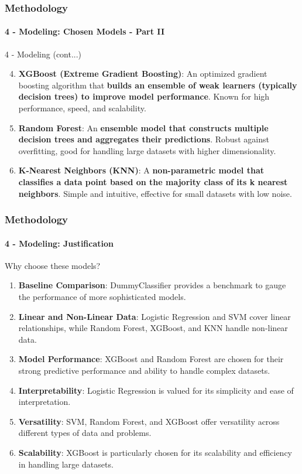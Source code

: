 \begin{frame}
	\frametitle{Methodology}
	\framesubtitle{4 - Modeling: Chosen Models - Part II}	
	\begin{block}{4 - Modeling (cont...)} 
		\begin{enumerate}
			\setcounter{enumi}{3}
			\item \textbf{XGBoost (Extreme Gradient Boosting)}: An optimized gradient boosting algorithm that \textbf{builds an ensemble of weak learners (typically decision trees) to improve model performance}. Known for high performance, speed, and scalability.
			
			\item \textbf{Random Forest}: An \textbf{ensemble model that constructs multiple decision trees and aggregates their predictions}. Robust against overfitting, good for handling large datasets with higher dimensionality.
			
			\item \textbf{K-Nearest Neighbors (KNN)}: A \textbf{non-parametric model that classifies a data point based on the majority class of its k nearest neighbors}. Simple and intuitive, effective for small datasets with low noise.
		\end{enumerate}
	\end{block}
\end{frame}




\begin{frame}
	\frametitle{Methodology}
	\framesubtitle{4 - Modeling: Justification}	
	\begin{alertblock}{Why choose these models?} 
		\begin{enumerate}
			\scriptsize
			\item \textbf{Baseline Comparison}: DummyClassifier provides a benchmark to gauge the performance of more sophisticated models.

			\item \textbf{Linear and Non-Linear Data}: Logistic Regression and SVM cover linear relationships, while Random Forest, XGBoost, and KNN handle non-linear data.

			\item \textbf{Model Performance}: XGBoost and Random Forest are chosen for their strong predictive performance and ability to handle complex datasets.

			\item \textbf{Interpretability}: Logistic Regression is valued for its simplicity and ease of interpretation.

			\item \textbf{Versatility}: SVM, Random Forest, and XGBoost offer versatility across different types of data and problems.

			\item \textbf{Scalability}: XGBoost is particularly chosen for its scalability and efficiency in handling large datasets.
		\end{enumerate}
	\end{alertblock}
\end{frame}



